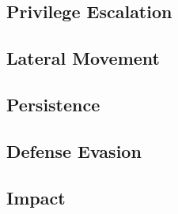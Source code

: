 \subsubsection{}

\subsubsection{}


\subsection{Privilege Escalation}
\subsection{Lateral Movement}
\subsection{Persistence}
\subsection{Defense Evasion}
\subsection{Impact}
